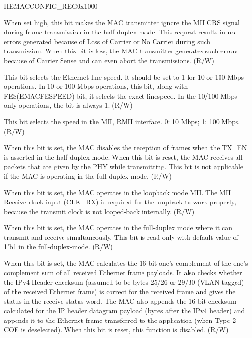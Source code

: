 \begin{register}{H}{EMACCONFIG\_REG}{0x1000}
\begin{regdesc}
\begin{reglist}
\item [EMACDISABLECRS]When set high, this bit makes the MAC transmitter ignore the MII CRS signal during frame transmission in the half-duplex mode. This request results in no errors generated because of Loss of Carrier or No Carrier during such transmission. When this bit is low, the MAC transmitter generates such errors because of Carrier Sense and can even abort the transmissions. (R/W)
\item [EMACMII]This bit selects the Ethernet line speed. It should be set to 1 for 10 or 100 Mbps operations. In 10 or 100 Mbps operations, this bit, along with FES(EMACFESPEED) bit, it selects the exact linespeed. In the 10/100 Mbps-only operations, the bit is always 1. (R/W)
\item [EMACFESPEED]This bit selects the speed in the MII, RMII interface. 0: 10 Mbps; 1: 100 Mbps. (R/W)
\item [EMACRXOWN]When this bit is set, the MAC disables the reception of frames when the TX\_EN is asserted in the half-duplex mode. When this bit is reset, the MAC receives all packets that are given by the PHY while transmitting. This bit is not applicable if the MAC is operating in the full-duplex mode. (R/W)
\item [EMACLOOPBACK]When this bit is set, the MAC operates in the loopback mode MII. The MII Receive clock input (CLK\_RX) is required for the loopback to work properly, because the transmit clock is not looped-back internally. (R/W)
\item [EMACDUPLEX]When this bit is set, the MAC operates in the full-duplex mode where it can transmit and receive simultaneously. This bit is read only with default value of 1'b1 in the full-duplex-mode. (R/W)
\item [EMACRXIPCOFFLOAD]When this bit is set, the MAC calculates the 16-bit one's complement of the one's complement sum of all received Ethernet frame payloads. It also checks whether the IPv4 Header checksum (assumed to be bytes 25/26 or 29/30 (VLAN-tagged) of the received Ethernet frame) is correct for the received frame and gives the status in the receive status word. The MAC also appends the 16-bit checksum calculated for the IP header datagram payload (bytes after the IPv4 header) and appends it to the Ethernet frame transferred to the application (when Type 2 COE is deselected). When this bit is reset, this function is disabled. (R/W)
\item [Continued on the next page...]
\end{reglist}\end{regdesc}
\end{register}

